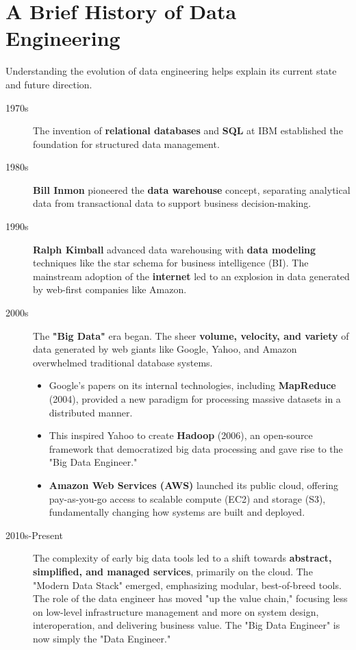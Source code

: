 \documentclass{article}
\begin{document}
\section{A Brief History of Data Engineering}
Understanding the evolution of data engineering helps explain its current state and future direction.
\begin{description}
    \item[1970s] The invention of \textbf{relational databases} and \textbf{SQL} at IBM established the foundation for structured data management.
    \item[1980s] \textbf{Bill Inmon} pioneered the \textbf{data warehouse} concept, separating analytical data from transactional data to support business decision-making.
    \item[1990s] \textbf{Ralph Kimball} advanced data warehousing with \textbf{data modeling} techniques like the star schema for business intelligence (BI). The mainstream adoption of the \textbf{internet} led to an explosion in data generated by web-first companies like Amazon.
    \item[2000s] The \textbf{"Big Data"} era began. The sheer \textbf{volume, velocity, and variety} of data generated by web giants like Google, Yahoo, and Amazon overwhelmed traditional database systems.
    \begin{itemize}
        \item Google's papers on its internal technologies, including \textbf{MapReduce} (2004), provided a new paradigm for processing massive datasets in a distributed manner.
        \item This inspired Yahoo to create \textbf{Hadoop} (2006), an open-source framework that democratized big data processing and gave rise to the "Big Data Engineer."
        \item \textbf{Amazon Web Services (AWS)} launched its public cloud, offering pay-as-you-go access to scalable compute (EC2) and storage (S3), fundamentally changing how systems are built and deployed.
    \end{itemize}
    \item[2010s-Present] The complexity of early big data tools led to a shift towards \textbf{abstract, simplified, and managed services}, primarily on the cloud. The "Modern Data Stack" emerged, emphasizing modular, best-of-breed tools. The role of the data engineer has moved "up the value chain," focusing less on low-level infrastructure management and more on system design, interoperation, and delivering business value. The "Big Data Engineer" is now simply the "Data Engineer."
\end{description}
\end{document}
